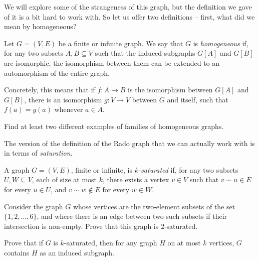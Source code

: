 \documentclass[nobib]{tufte-handout}
\begin{document}
We will explore some of the strangeness of this graph, but the definition we gave of it is a bit hard to work with. So let us offer two definitions -- first, what did we mean by homogeneous?

\begin{definition}
  Let $G = (V,E)$ be a finite or infinite graph. We say that $G$ is \emph{homogeneous} if, for any two subsets $A, B \subseteq V$ such that the induced subgraphs $G[A]$ and $G[B]$ are isomorphic, the isomorphism between them can be extended to an automorphism of the entire graph.

  Concretely, this means that if $f: A \to B$ is the isomorphism between $G[A]$ and $G[B]$, there is an isomorphism $g: V \to V$ between $G$ and itself, such that $f(a) = g(a)$ whenever $a \in A$.
\end{definition}

\begin{xca}
  Find at least two different examples of families of homogeneous graphs.
\end{xca}

The version of the definition of the Rado graph that we can actually work with is in terms of \emph{saturation}.

\begin{definition}
  A graph $G = (V,E)$, finite or infinite, is \emph{$k$-saturated} if, for any two subsets $U, W \subseteq V$, each of size at most $k$, there exists a vertex $v \in V$ such that $v \sim u \in E$ for every $u \in U$, and $v \sim w \not\in E$ for every $w \in W$.
\end{definition}

\begin{xca}
  Consider the graph $G$ whose vertices are the two-element subsets of the set $\{1,2,\ldots,6\}$, and where there is an edge between two such subsets if their intersection is non-empty. Prove that this graph is $2$-saturated.
\end{xca}

\begin{xca}
  Prove that if $G$ is $k$-saturated, then for any graph $H$ on at most $k$ vertices, $G$ contains $H$ as an induced subgraph.
\end{xca}
\end{document}
